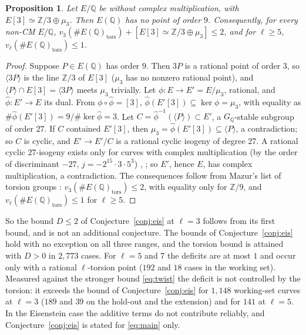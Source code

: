\documentclass[11pt]{amsart}
\newtheorem{proposition}[theorem]{Proposition}
\theoremstyle{definition}
\newcommand{\Q}{\mathbb{Q}}
\newcommand{\Z}{\mathbb{Z}}
\begin{document}
\begin{proposition}\label{prop:no9}
Let $E/\Q$ be without complex multiplication, with $E[3]\simeq\Z/3\oplus\mu_3$. Then $E(\Q)$ has no point of order $9$. Consequently, for every non-CM $E/\Q$, $v_3(\#E(\Q)_{\mathrm{tors}})+[E[3]\simeq\Z/3\oplus\mu_3]\le2$, and for $\ell\ge5$, $v_\ell(\#E(\Q)_{\mathrm{tors}})\le1$.
\end{proposition}
\begin{proof}
Suppose $P\in E(\Q)$ has order $9$. Then $3P$ is a rational point of order $3$, so $\langle3P\rangle$ is the line $\Z/3$ of $E[3]$ ($\mu_3$ has no nonzero rational point), and $\langle P\rangle\cap E[3]=\langle3P\rangle$ meets $\mu_3$ trivially. Let $\phi\colon E\to E'=E/\mu_3$, rational, and $\hat\phi\colon E'\to E$ its dual. From $\phi\circ\hat\phi=[3]$, $\hat\phi(E'[3])\subseteq\ker\phi=\mu_3$, with equality as $\#\hat\phi(E'[3])=9/\#\ker\hat\phi=3$. Let $C=\hat\phi^{-1}(\langle P\rangle)\subset E'$, a $G_\Q$-stable subgroup of order $27$. If $C$ contained $E'[3]$, then $\mu_3=\hat\phi(E'[3])\subseteq\langle P\rangle$, a contradiction; so $C$ is cyclic, and $E'\to E'/C$ is a rational cyclic isogeny of degree $27$. A rational cyclic $27$-isogeny exists only for curves with complex multiplication (by the order of discriminant $-27$, $j=-2^{15}\cdot3\cdot5^3$) \cite{Ligozat75}, \cite{Kenku}; so $E'$, hence $E$, has complex multiplication, a contradiction. The consequences follow from Mazur's list of torsion groups \cite{Mazur77}: $v_3(\#E(\Q)_{\mathrm{tors}})\le2$, with equality only for $\Z/9$, and $v_\ell(\#E(\Q)_{\mathrm{tors}})\le1$ for $\ell\ge5$.
\end{proof}

So the bound $D\le2$ of Conjecture~\ref{conj:eis} at $\ell=3$ follows from its first bound, and is not an additional conjecture. The bounds of Conjecture~\ref{conj:eis} hold with no exception on all three ranges, and the torsion bound is attained with $D>0$ in $2{,}773$ cases. For $\ell=5$ and $7$ the deficits are at most $1$ and occur only with a rational $\ell$-torsion point ($192$ and $18$ cases in the working set). Measured against the stronger bound \eqref{eq:twist} the deficit is not controlled by the torsion: it exceeds the bound of Conjecture~\ref{conj:eis} for $1{,}148$ working-set curves at $\ell=3$ ($189$ and $39$ on the hold-out and the extension) and for $141$ at $\ell=5$. In the Eisenstein case the additive terms do not contribute reliably, and Conjecture~\ref{conj:eis} is stated for \eqref{eq:main} only.
\end{document}
